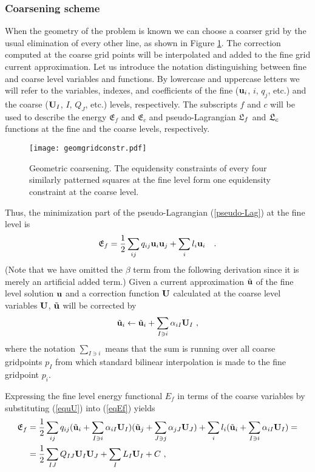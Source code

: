 \documentclass[final]{siamltex}
\begin{document}
\subsubsection{Coarsening scheme}\label{sCoarsening-scheme}
When the geometry of the problem is known we can choose a coarser
grid by the usual elimination of every other line, as shown in
Figure \ref{geomgridcors}. The correction computed at the coarse
grid points will be interpolated and added to the fine grid
current approximation. Let us introduce the notation
distinguishing between fine and coarse level variables and
functions. By lowercase and uppercase letters we will refer to the
variables, indexes, and coefficients of the fine (${\bf u}_i$, $i$,
$q_j$, etc.) and the coarse (${\bf U}_I$, $I$, $Q_J$, etc.) levels,
respectively. The subscripts $f$ and $c$ will be used to describe
the energy $\mathfrak{E}_{f}$ and $\mathfrak{E}_{c}$ and
pseudo-Lagrangian $\mathfrak{L}_{f}$ and $\mathfrak{L}_{c}$ functions at the fine
and the coarse levels, respectively.
\begin{figure}
\vbox{\center\texttt{[image: geomgridconstr.pdf]}}
\caption{Geometric coarsening. The equidensity constraints of
every four similarly patterned squares at the fine level form one
equidensity constraint at the coarse level.}\label{geomgridcors}
\end{figure}
\par Thus, the minimization part of the pseudo-Lagrangian (\ref{pseudo-Lag})
at the fine level is
\begin{align}\label{eqEf}
\mathfrak{E}_f=\frac{1}{2}\sum_{ij}q_{ij}{\bf u}_i {\bf u}_j+\sum_{i} l_i {\bf u}_i~~~.\end{align}
(Note that we have omitted the $\beta$ term from the following
derivation since it is merely an artificial added term.) Given a
current approximation $\tilde{{\bf u}}$ of the fine level solution
${\bf u}$ and a correction function ${\bf U}$ calculated at the coarse
level variables ${\bf U}$, $\tilde{{\bf u}}$ will be corrected by
\begin{equation}\label{equU}
\tilde{{\bf u}}_i \leftarrow \tilde{{\bf u}}_i+\sum_{I\ni i}
\alpha_{iI}{\bf U}_I~,
\end{equation}
where the notation $\sum_{I\ni i}$ means that the sum is running
over all coarse gridpoints $p_I$ from which standard bilinear
interpolation is made to the fine gridpoint $p_i$.
\par Expressing the fine level energy
functional $E_f$ in terms of the coarse variables by substituting
(\ref{equU}) into (\ref{eqEf}) yields
\begin{align*}
\mathfrak{E}_f &=
\frac{1}{2}\sum_{ij}q_{ij}(\tilde{{\bf u}}_i+\sum_{I\ni i}
\alpha_{iI}{\bf U}_I)(\tilde{{\bf u}}_j+\sum_{J\ni j} \alpha_{jJ}{\bf U}_J)+\sum_i l_i(\tilde{{\bf u}}_i+\sum_{I\ni i} \alpha_{iI}{\bf U}_I)=\\
&=\frac{1}{2}\sum_{IJ} Q_{IJ}{\bf U}_I{\bf U}_J + \sum_{I} L_I{\bf U}_I + C~,
\end{align*}
\end{document}
